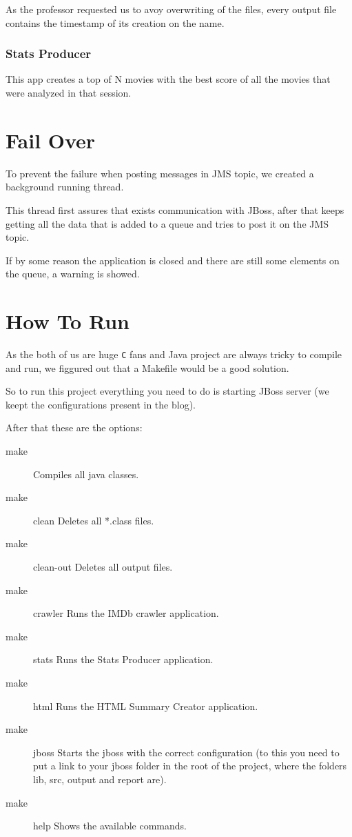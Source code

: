 \documentclass[a4paper]{article}
\begin{document}
As the professor requested us to avoy overwriting of the files, every output file contains the timestamp of its creation on the name.

\subsubsection{Stats Producer}
\indent \indent This app creates a top of N movies with the best score of all the movies that were analyzed in that session.

\section{Fail Over}
\indent \indent To prevent the failure when posting messages in JMS topic, we created a background running thread.

This thread first assures that exists communication with JBoss, after that keeps getting all the data that is added to a queue and tries to post it on the JMS topic.

If by some reason the application is closed and there are still some elements on the queue, a warning is showed.

\clearpage
\section{How To Run}
\indent \indent As the both of us are huge \texttt{C} fans and Java project are always tricky to compile and run, we figgured out that a Makefile would be a good solution.

So to run this project everything you need to do is starting JBoss server (we keept the configurations present in the blog).

After that these are the options:
\begin{description}
	\item [make]
		Compiles all java classes.
	\item [make] clean
		Deletes all *.class files.
	\item [make] clean-out
		Deletes all output files.
	\item [make] crawler
		Runs the IMDb crawler application.
	\item [make] stats
		Runs the Stats Producer application.
	\item [make] html
		Runs the HTML Summary Creator application.
	\item [make] jboss
		Starts the jboss with the correct configuration (to this you need to put a link to your jboss folder in the root of the project, where the folders lib, src, output and report are).
	\item [make] help
		Shows the available commands.
\end{description}
\end{document}
